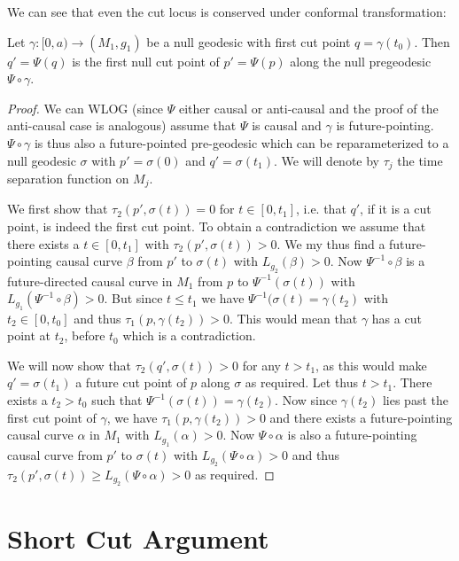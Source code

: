 We can see that even the cut locus is conserved under conformal transformation:
\begin{proposition}
Let $\gamma:[0,a)\to (M_1,g_1)$ be a null geodesic with first cut point $q=\gamma(t_0)$. Then $q'=\Psi(q)$ is the first null cut point of $p'=\Psi(p)$ along the null pregeodesic $\Psi\circ\gamma$.
\end{proposition}
\begin{proof}
We can WLOG (since $\Psi$ either causal or anti-causal and the proof of the anti-causal case is analogous) assume that $\Psi$ is causal and $\gamma$ is future-pointing. $\Psi\circ\gamma$ is thus also a future-pointed pre-geodesic which can be reparameterized to a null geodesic $\sigma$ with $p'=\sigma(0)$ and $q'=\sigma(t_1)$. We will denote by $\tau_j$ the time separation function on $M_j$.

We first show that $\tau_2(p',\sigma(t))=0$ for $t\in [0,t_1]$, i.e. that $q'$, if it is a cut point, is indeed the first cut point. To obtain a contradiction we assume that there exists a $t\in [0,t_1]$ with $\tau_2(p',\sigma(t))>0$. We my thus find a future-pointing causal curve $\beta$ from $p'$ to $\sigma(t)$ with $L_{g_2}(\beta)>0$. Now $\Psi^{-1}\circ \beta$ is a future-directed causal curve in $M_1$ from $p$ to $\Psi^{-1}(\sigma(t))$ with $L_{g_1}(\Psi^{-1}\circ\beta)>0$. But since $t\leq t_1$ we have $\Psi^{-1}(\sigma(t) = \gamma(t_2)$ with $t_2\in [0,t_0]$ and thus $\tau_1(p,\gamma(t_2))>0$. This would mean that $\gamma$ has a cut point at $t_2$, before $t_0$ which is a contradiction.

We will now show that $\tau_2(q',\sigma(t)) > 0$ for any $t>t_1$, as this would make $q'=\sigma(t_1)$ a future cut point of $p$ along $\sigma$ as required.
Let thus $t>t_1$. There exists a $t_2>t_0$ such that $\Psi^{-1}(\sigma(t))=\gamma(t_2)$. Now since $\gamma(t_2)$ lies past the first cut point of $\gamma$, we have $\tau_1(p,\gamma(t_2))>0$ and there exists a future-pointing causal curve $\alpha$ in $M_1$ with $L_{g_1}(\alpha)>0$. Now $\Psi\circ\alpha$ is also a future-pointing causal curve from $p'$ to $\sigma(t)$ with $L_{g_2}(\Psi\circ\alpha)>0$ and thus $\tau_2(p',\sigma(t)) \ge L_{g_2}(\Psi\circ\alpha)>0$ as required.
\end{proof}

\section{Short Cut Argument}

